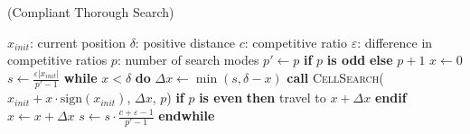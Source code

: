 \begin{algorithm}[H]
\caption{(Compliant Thorough Search)}
    \begin{algorithmic}[1]
            \Statex $x_{init}$: current position
            \Statex $\delta$: positive distance
            \Statex $c$: competitive ratio
            \Statex $\varepsilon$: difference in competitive ratios
            \Statex $p$: number of search modes
            \State $p' \gets p$ \textbf{if} $p$ \textbf{is odd} \textbf{else} $p + 1$
            \State $x \gets 0$ 
            \State $s \gets \frac{\varepsilon |x_{init}|}{p' - 1}$ 
            \State \textbf{while} $x < \delta$ \textbf{do} \Indent
            \State $\Delta x \gets \min(s, \delta - x)$
            \State \textbf{call} \textsc{CellSearch}($x_{init} + x \cdot \text{sign}(x_{init})$, $\Delta x$, $p$)
            \State \textbf{if} $p$ \textbf{is even} \textbf{then} travel to $x + \Delta x$ \textbf{endif}
            \State $x \gets x + \Delta x$
            \State $s \gets s \cdot \frac{c + \varepsilon - 1}{p' - 1}$\EndIndent
            \State \textbf{endwhile}
        \EndProcedure
    \end{algorithmic}
\end{algorithm}

